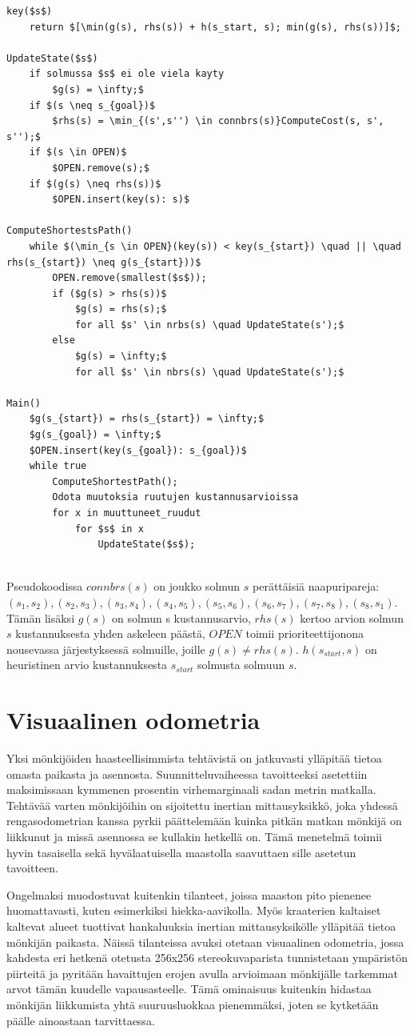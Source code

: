 \documentclass[finnish]{tktltiki2}
\theoremstyle{definition}
\theoremstyle{remark}
\begin{document}
\lstset{basicstyle=\footnotesize, tabsize=4}
\begin{lstlisting}[mathescape=true]
key($s$)
	return $[\min(g(s), rhs(s)) + h(s_start, s); min(g(s), rhs(s))]$;

UpdateState($s$)
	if solmussa $s$ ei ole viela kayty
		$g(s) = \infty;$
	if $(s \neq s_{goal})$
		$rhs(s) = \min_{(s',s'') \in connbrs(s)}ComputeCost(s, s', s'');$
	if $(s \in OPEN)$
		$OPEN.remove(s);$
	if $(g(s) \neq rhs(s))$
		$OPEN.insert(key(s): s)$

ComputeShortestsPath()
	while $(\min_{s \in OPEN}(key(s)) < key(s_{start}) \quad || \quad rhs(s_{start}) \neq g(s_{start}))$
		OPEN.remove(smallest($s$));
		if ($g(s) > rhs(s))$
			$g(s) = rhs(s);$
			for all $s' \in nrbs(s) \quad UpdateState(s');$
		else
			$g(s) = \infty;$
			for all $s' \in nbrs(s) \quad UpdateState(s');$

Main()
	$g(s_{start}) = rhs(s_{start}) = \infty;$
	$g(s_{goal}) = \infty;$
	$OPEN.insert(key(s_{goal}): s_{goal})$
	while true
		ComputeShortestPath();
		Odota muutoksia ruutujen kustannusarvioissa
		for x in muuttuneet_ruudut
			for $s$ in x
				UpdateState($s$);


\end{lstlisting}

Pseudokoodissa $connbrs(s)$ on joukko solmun $s$ perättäisiä naapuripareja: ${(s_1,s_2), (s_2,s_3), (s_3,s_4),(s_4,s_5),(s_5,s_6),(s_6,s_7),(s_7,s_8),(s_8,s_1)}$. Tämän lisäksi $g(s)$ on solmun s kustannusarvio, $rhs(s)$ kertoo arvion solmun $s$ kustannuksesta yhden askeleen päästä, $OPEN$ toimii prioriteettijonona nousevassa järjestyksessä solmuille, joille $g(s) \neq rhs(s)$. $h(s_{start}, s)$ on heuristinen arvio kustannuksesta $s_{start}$ solmusta solmuun $s$.

\section{Visuaalinen odometria}
Yksi mönkijöiden haasteellisimmista tehtävistä on jatkuvasti ylläpitää tietoa omasta paikasta ja asennosta. Suunnitteluvaiheessa tavoitteeksi asetettiin maksimissaan kymmenen prosentin virhemarginaali sadan metrin matkalla. Tehtävää varten mönkijöihin on sijoitettu inertian mittausyksikkö, joka yhdessä rengasodometrian kanssa pyrkii päättelemään kuinka pitkän matkan mönkijä on liikkunut ja missä asennossa se kullakin hetkellä on. Tämä menetelmä toimii hyvin tasaisella sekä hyvälaatuisella maastolla saavuttaen sille asetetun tavoitteen.

Ongelmaksi muodostuvat kuitenkin tilanteet, joissa maaston pito pienenee huomattavasti, kuten esimerkiksi hiekka-aavikolla. Myös kraaterien kaltaiset kaltevat alueet tuottivat hankaluuksia inertian mittausyksikölle ylläpitää tietoa mönkijän paikasta. Näissä tilanteissa avuksi otetaan visuaalinen odometria, jossa kahdesta eri hetkenä otetusta 256x256 stereokuvaparista tunnistetaan ympäristön piirteitä ja pyritään havaittujen erojen avulla arvioimaan mönkijälle tarkemmat arvot tämän kuudelle vapausasteelle. Tämä ominaisuus kuitenkin hidastaa mönkijän liikkumista yhtä suuruusluokkaa pienemmäksi, joten se kytketään päälle ainoastaan tarvittaessa. \cite{cheng2005visual}
\end{document}
